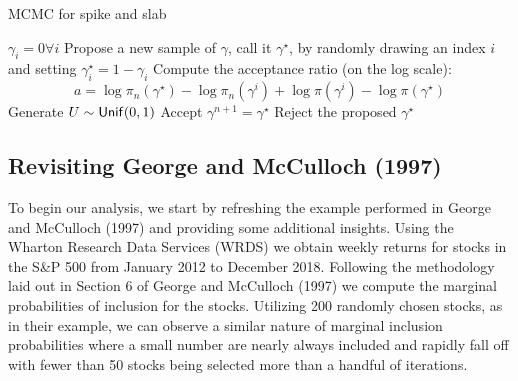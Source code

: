 \documentclass[a4paper, 12pt]{article}
\theoremstyle{plain}
\theoremstyle{definition}
\theoremstyle{remark}
\newcommand{\unif}{{\sf Unif}}
\begin{document}
\begin{algorithm}
\caption{MCMC for spike and slab}
\begin{algorithmic}[1] 
\STATE $\gamma_i = 0 \forall i$
\STATE Propose a new sample of $\gamma$, call it $\gamma^\star$, by randomly drawing an index $i$ and setting $\gamma^\star_i=1-\gamma_i$
\STATE Compute the acceptance ratio (on the log scale):
	\[a=\log \pi_n(\gamma^\star) - \log \pi_n(\gamma^i) + \log \pi(\gamma^i) - \log \pi(\gamma^\star)\]
\STATE Generate $U\sim \unif(0,1)$
\STATE Accept $\gamma^{n+1}=\gamma^\star$
\ELSE
\STATE Reject the proposed $\gamma^\star$
\ENDIF
\ENDWHILE
\end{algorithmic}
\end{algorithm}


\subsection{Revisiting George and McCulloch (1997)}

To begin our analysis, we start by refreshing the example performed in George and McCulloch (1997) and providing some additional insights. Using the Wharton Research Data Services (WRDS) we obtain weekly returns for stocks in the S\&P 500 from January 2012 to December 2018. Following the methodology laid out in Section 6 of George and McCulloch (1997) we compute the marginal probabilities of inclusion for the stocks. Utilizing 200 randomly chosen stocks, as in their example, we can observe a similar nature of marginal inclusion probabilities where a small number are nearly always included and rapidly fall off with fewer than 50 stocks being selected more than a handful of iterations.
\end{document}
